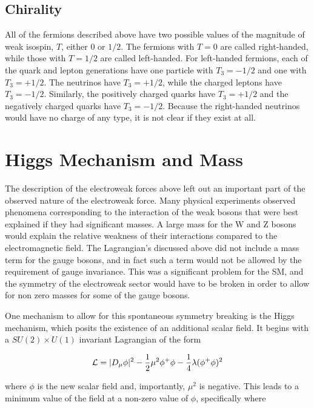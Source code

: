 \subsection{Chirality}

All of the fermions described above have two possible values of the magnitude of weak isospin, $T$, either $0$ or $1/2$.
The fermions with $T = 0$ are called right-handed, while those with $T=1/2$ are called left-handed.
For left-handed fermions, each of the quark and lepton generations have one particle with $T_3 = -1/2$ and one with $T_3 = +1/2$.
The neutrinos have $T_3 = +1/2$, while the charged leptons have $T_3 = -1/2$.
Similarly, the positively charged quarks have $T_3 = +1/2$ and the negatively charged quarks have $T_3 = -1/2$.
Because the right-handed neutrinos would have no charge of any type, it is not clear if they exist at all.


\section{Higgs Mechanism and Mass}

The description of the electroweak forces above left out an important part of the observed nature of the electroweak force.
Many physical experiments observed phenomena corresponding to the interaction of the weak bosons that were best explained if they had significant masses.
A large mass for the W and Z bosons would explain the relative weakness of their interactions compared to the electromagnetic field.
The Lagrangian's discussed above did not include a mass term for the gauge bosons, and in fact such a term would not be allowed by the requirement of gauge invariance. 
This was a significant problem for the \ac{SM}, and the symmetry of the electroweak sector would have to be broken in order to allow for non zero masses for some of the gauge bosons.

One mechanism to allow for this spontaneous symmetry breaking is the Higgs mechanism, which posits the existence of an additional scalar field.
It begins with a $SU(2)\times U(1)$ invariant Lagrangian of the form 

\begin{equation}
  \mathcal{L} = |D_\mu\phi|^2 - \frac{1}{2}\mu^2\phi^+\phi - \frac{1}{4}\lambda(\phi^+\phi)^2
\end{equation}

\noindent where $\phi$ is the new scalar field and, importantly, $\mu^2$ is negative.
This leads to a minimum value of the field at a non-zero value of $\phi$, specifically where

